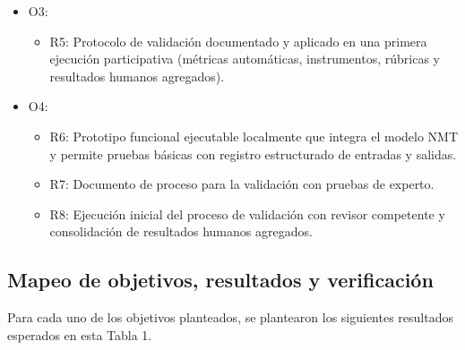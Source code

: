 \documentclass[12pt,a4paper,oneside]{book}
\begin{document}
\begin{itemize}
\item
  O3:

  \begin{itemize}
  \item
    R5: Protocolo de validación documentado y aplicado en una primera ejecución participativa (métricas automáticas, instrumentos, rúbricas y resultados humanos agregados).
  \end{itemize}
\item
  O4:

  \begin{itemize}
  \item
    R6: Prototipo funcional ejecutable localmente que integra el modelo NMT y permite pruebas básicas con registro estructurado de entradas y salidas.
  \item
    R7: Documento de proceso para la validación con pruebas de experto.
  \item
    R8: Ejecución inicial del proceso de validación con revisor competente y consolidación de resultados humanos agregados.
  \end{itemize}
\end{itemize}

\subsection{Mapeo de objetivos, resultados y verificación}\label{mapeo-de-objetivos-resultados-y-verificaciuxf3n}

Para cada uno de los objetivos planteados, se plantearon los siguientes resultados esperados en esta Tabla 1.
\end{document}
